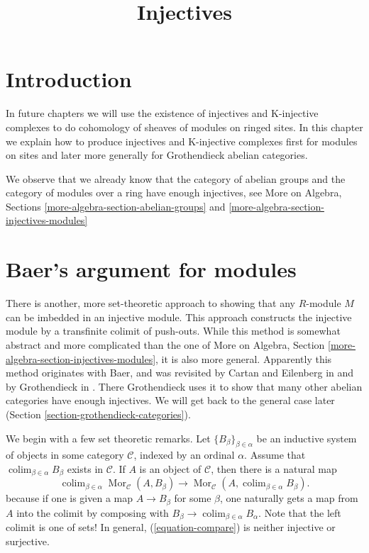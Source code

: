 \documentclass{stacks-project}
\theoremstyle{plain}
\theoremstyle{definition}
\theoremstyle{remark}
\numberwithin{equation}{subsection}
\def\colim{\mathop{\mathrm{colim}}\nolimits}
\def\Mor{\mathop{\mathrm{Mor}}\nolimits}
\begin{document}
\title{Injectives}


\maketitle

\label{section-phantom}

\tableofcontents

\section{Introduction}
\label{section-introduction}

\noindent
In future chapters we will use the existence of injectives and
K-injective complexes to do cohomology of sheaves of modules on
ringed sites. In this chapter we explain how to produce injectives
and K-injective complexes first for modules on sites and later
more generally for Grothendieck abelian categories.

\medskip\noindent
We observe that we already know that the category of
abelian groups and the category of modules over a ring have
enough injectives, see More on Algebra, Sections
\ref{more-algebra-section-abelian-groups} and
\ref{more-algebra-section-injectives-modules}





\section{Baer's argument for modules}
\label{section-baer}

\noindent
There is another, more set-theoretic approach to showing that any $R$-module
$M$ can be imbedded in an injective module. This approach constructs
the injective module by a transfinite colimit of push-outs. While this
method is somewhat abstract and more complicated than the one of
More on Algebra, Section \ref{more-algebra-section-injectives-modules},
it is also more general. Apparently this method originates with Baer,
and was revisited by Cartan and Eilenberg in
\cite{Cartan-Eilenberg} and by Grothendieck in \cite{Tohoku}.
There Grothendieck uses it to show that
many other abelian categories have enough injectives. We will get back to
the general case later (Section \ref{section-grothendieck-categories}).

\medskip\noindent
We begin with a few set theoretic remarks.
Let $\{B_{\beta}\}_{\beta \in \alpha}$ be an inductive system of
objects in some category $\mathcal{C}$, indexed by
an ordinal $\alpha$. Assume that $\colim_{\beta \in \alpha} B_\beta$
exists in $\mathcal{C}$. If $A$ is an object of $\mathcal{C}$, then there is a
natural map
\begin{equation}
\label{equation-compare}
\colim_{\beta \in \alpha} \Mor_\mathcal{C}(A, B_\beta)
\longrightarrow
\Mor_\mathcal{C}(A, \colim_{\beta \in \alpha} B_\beta).
\end{equation}
because if one is given a map $A \to B_\beta$ for some $\beta$, one
naturally gets a map from $A$  into the colimit by composing with
$B_\beta \to \colim_{\beta \in \alpha} B_\alpha$.
Note that the left colimit is one of sets! In general, (\ref{equation-compare})
is neither injective or surjective.
\end{document}
